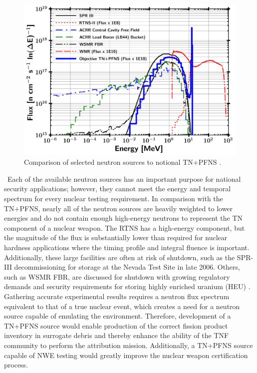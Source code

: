 \begin{figure}[ht]
	\centering
	\includegraphics[width=\linewidth]{Figures/Chapter1/SourceComparison.png}
	\caption[Comparison of selected neutron sources to notional TN+PFNS.]{Comparison of selected neutron sources to notional TN+PFNS {\cite{Bevins}}.}
    \label{fig:CompSource}
\end{figure}

\ Each of the available neutron sources has an important purpose for national security applications; however, they cannot meet the energy and temporal spectrum for every nuclear testing requirement. 
In comparison with the TN+PFNS, nearly all of the neutron sources are heavily weighted to lower energies and do not contain enough high-energy neutrons to represent the TN component of a nuclear weapon. 
The RTNS has a high-energy component, but the magnitude of the flux is substantially lower than required for nuclear hardness applications where the timing profile and integral fluence is important.  
Additionally, these large facilities are often at risk of shutdown, such as the SPR-III decommissioning for storage at the Nevada Test Site in late 2006\cite{SandiaNationalLaboratory2007}. 
Others, such as WSMR FBR, are discussed for shutdown with growing regulatory demands and security requirements for storing highly enriched uranium (HEU) \cite{UnitedStatesNuclearRegulatoryCommission2018}.
Gathering accurate experimental results requires a neutron flux spectrum equivalent to that of a true nuclear event, which creates a need for a neutron source capable of emulating the environment. 
Therefore, development of a TN+PFNS source would enable production of the correct fission product inventory in surrogate debris and thereby enhance the ability of the TNF community to perform the attribution mission. 
Additionally, a TN+PFNS source capable of NWE testing would greatly improve the nuclear weapon certification process. 

